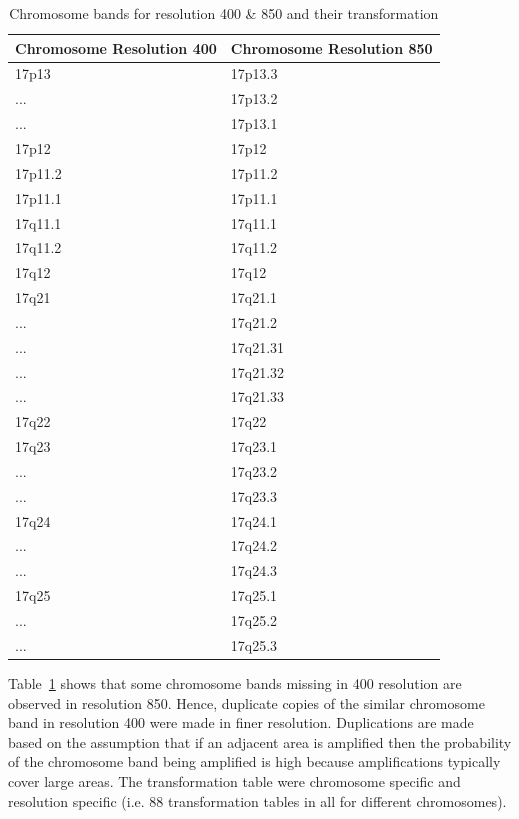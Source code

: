 \begin{table}[h!]
  \centering
  \begin{tabular}{|@{}l@{}|@{}l@{}|}
    \hline
    \textbf{Chromosome Resolution 400} & \textbf{Chromosome Resolution 850}  \\
    \hline
    17p13	& 	17p13.3  \\ \hline
    ...		& 	17p13.2  \\ \hline
    ...		& 	17p13.1  \\ \hline
    17p12	& 	17p12 	 \\ \hline
    17p11.2	& 	17p11.2  \\ \hline
    17p11.1	& 	17p11.1  \\ \hline
    17q11.1	& 	17q11.1  \\ \hline
    17q11.2	& 	17q11.2  \\ \hline
    17q12	& 	17q12 	 \\ \hline
    17q21	& 	17q21.1  \\ \hline
    ...		& 	17q21.2  \\ \hline
    ...		& 	17q21.31 \\ \hline
    ...		& 	17q21.32 \\ \hline
    ...		& 	17q21.33 \\ \hline
    17q22	& 	17q22 	 \\ \hline
    17q23	& 	17q23.1  \\ \hline
    ...		& 	17q23.2  \\ \hline
    ...		& 	17q23.3  \\ \hline
    17q24	& 	17q24.1  \\ \hline
    ...		& 	17q24.2  \\ \hline
    ...		& 	17q24.3  \\ \hline
    17q25	& 	17q25.1  \\ \hline
    ...		& 	17q25.2  \\ \hline
    ...		& 	17q25.3  \\ \hline   
  \end{tabular}
  \caption[Example transformation table in chromosome 17 ]{Chromosome bands for resolution 400 \& 850 and their transformation} \label{Tab:Transformation}
\end{table}

Table~\ref{Tab:Transformation} shows that some chromosome bands missing in 400 resolution are observed in resolution 850. Hence, duplicate copies of the similar chromosome band in resolution 400 were made in finer resolution. Duplications are made based on the assumption that if an adjacent area is amplified then the probability of the chromosome band being amplified is high because amplifications typically cover large areas. The transformation table were chromosome specific and resolution specific (i.e. 88 transformation tables in all for different chromosomes). 

